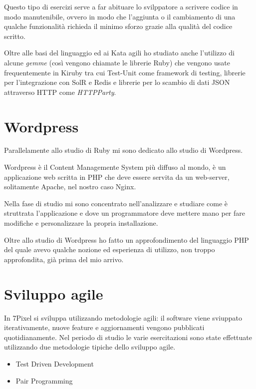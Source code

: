 Questo tipo di esercizi serve a far abituare
lo svilppatore a scrivere codice in modo manutenibile, ovvero in modo che l'aggiunta o il cambiamento di una qualche 
funzionalità richieda il minimo sforzo grazie alla qualità del codice scritto.

Oltre alle basi del linguaggio ed ai Kata agili ho studiato anche l'utilizzo di alcune \emph{gemme} (così vengono chiamate le 
librerie Ruby) che vengono
usate frequentemente in Kiruby tra cui Test-Unit come framework di testing, librerie per l'integrazione
con SolR e Redis e librerie per lo scambio di dati JSON attraverso HTTP come \emph{HTTPParty}.

\section{Wordpress}

Parallelamente allo studio di Ruby mi sono dedicato allo studio di Wordpress.

Wordpress è il Content Managemente System più diffuso al mondo, è un applicazione web scritta in PHP
che deve essere servita da un web-server, solitamente Apache, nel nostro caso Nginx.

Nella fase di studio mi sono concentrato nell'analizzare e studiare come è struttrata l'applicazione
e dove un programmatore deve mettere mano per fare modifiche e personalizzare la propria installazione.

Oltre allo studio di Wordpress ho fatto un approfondimento del linguaggio PHP del quale avevo qualche
nozione ed esperienza di utilizzo, non troppo approfondita, già prima del mio arrivo. 





\section{Sviluppo agile}

In 7Pixel si sviluppa utilizzando metodologie agili: il software viene sviuppato
iterativamente, nuove feature e aggiornamenti vengono pubblicati quotidianamente.
Nel periodo di studio le varie esercitazioni sono state effettuate
utilizzando due metodologie tipiche dello sviluppo agile.

\begin{itemize}
\item Test Driven Development
\item Pair Programming
\end{itemize}

